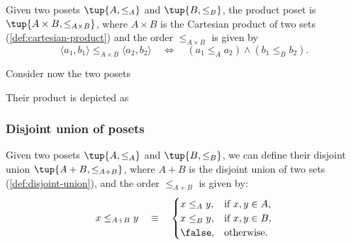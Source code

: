 \begin{definition}
Given two posets $\tup{A, \leq_A}$
and  $\tup{B, \leq_B}$, the product poset is $\tup{A \times B, \leq_{A\times B}}$, where $A \times B$ is the Cartesian product of two sets (\cref{def:cartesian-product}) and the order $\leq_{A\times B}$ is given by
\begin{equation}
        \langle a_1, b_1 \rangle
        \leq_{A\times B}
        \langle a_2, b_2 \rangle
        \quad
        \Leftrightarrow
        \quad
        ( a_1 \leq_A a_2) \wedge
        (b_1 \leq_B b_2).
    \end{equation}
\end{definition}

\begin{figure}[h!]
\end{figure}

\begin{example}
Consider now the two posets
\begin{center}
\end{center}
Their product is depicted as
\begin{center}
\end{center}
\end{example}

\subsubsection{Disjoint union of posets}


\begin{definition}
Given two posets $\tup{A, \leq_A} $ and $\tup{B, \leq_B} $,
we can define their disjoint union $\tup{ A + B, \leq_{A + B}}$, where $A + B$
is the disjoint union of two sets (\cref{def:disjoint-union}), and the
order $\leq_{A + B}$ is given by:
\begin{equation}
    x \leq_{A + B} y \quad\equiv\quad
    \begin{cases}
        x \leq_A y, & \text{if } x,y \in A, \\
        x \leq_B y, & \text{if } x,y \in B, \\
        \false,  & \text{otherwise}.
    \end{cases}
\end{equation}
\end{definition}


\begin{figure}[h!]
    \centering
    \caption{\label{fig:poset-coproduct}}
\end{figure}


